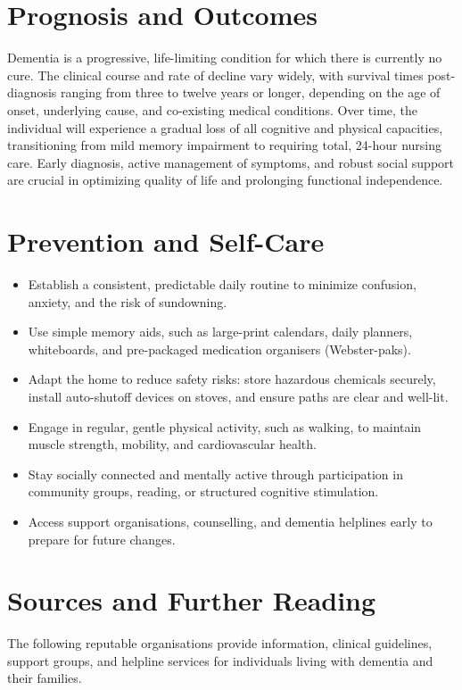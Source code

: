 \section*{Prognosis and Outcomes}
Dementia is a progressive, life-limiting condition for which there is currently no cure. The clinical course and rate of decline vary widely, with survival times post-diagnosis ranging from three to twelve years or longer, depending on the age of onset, underlying cause, and co-existing medical conditions. Over time, the individual will experience a gradual loss of all cognitive and physical capacities, transitioning from mild memory impairment to requiring total, 24-hour nursing care. Early diagnosis, active management of symptoms, and robust social support are crucial in optimizing quality of life and prolonging functional independence.

\section*{Prevention and Self-Care}
\begin{itemize}
    \item Establish a consistent, predictable daily routine to minimize confusion, anxiety, and the risk of sundowning.
    \item Use simple memory aids, such as large-print calendars, daily planners, whiteboards, and pre-packaged medication organisers (Webster-paks).
    \item Adapt the home to reduce safety risks: store hazardous chemicals securely, install auto-shutoff devices on stoves, and ensure paths are clear and well-lit.
    \item Engage in regular, gentle physical activity, such as walking, to maintain muscle strength, mobility, and cardiovascular health.
    \item Stay socially connected and mentally active through participation in community groups, reading, or structured cognitive stimulation.
    \item Access support organisations, counselling, and dementia helplines early to prepare for future changes.
\end{itemize}

\section*{Sources and Further Reading}
The following reputable organisations provide information, clinical guidelines, support groups, and helpline services for individuals living with dementia and their families.

